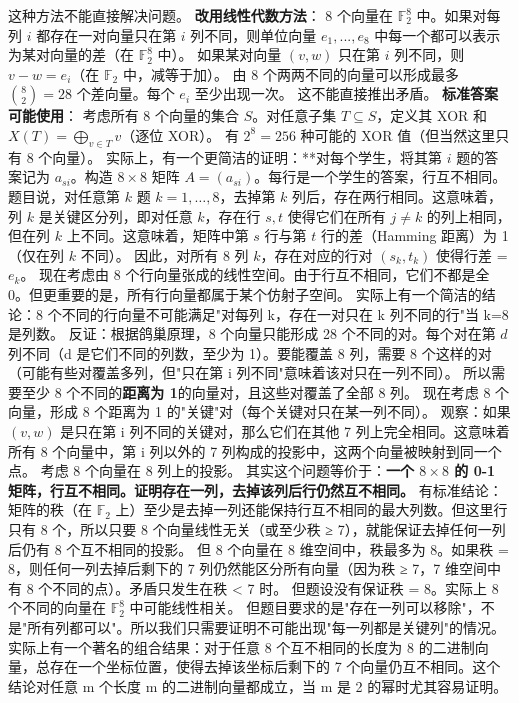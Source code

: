 \documentclass[10pt,a4paper,openany]{ctexbook}
\theoremstyle{definition}
\theoremstyle{remark}
\begin{document}
这种方法不能直接解决问题。
\textbf{改用线性代数方法}：
8 个向量在 $\mathbb{F}_2^8$ 中。如果对每列 $i$ 都存在一对向量只在第 $i$ 列不同，则单位向量 $e_1,...,e_8$ 中每一个都可以表示为某对向量的差（在 $\mathbb{F}_2^8$ 中）。
如果某对向量 $(v,w)$ 只在第 $i$ 列不同，则 $v - w = e_i$（在 $\mathbb{F}_2$ 中，减等于加）。
由 8 个两两不同的向量可以形成最多 $\binom{8}{2}=28$ 个差向量。每个 $e_i$ 至少出现一次。
这不能直接推出矛盾。
\textbf{标准答案可能使用}：
考虑所有 8 个向量的集合 $S$。对任意子集 $T \subseteq S$，定义其 XOR 和 $X(T) = \bigoplus_{v \in T} v$（逐位 XOR）。
有 $2^8 = 256$ 种可能的 XOR 值（但当然这里只有 8 个向量）。
实际上，有一个更简洁的证明：**对每个学生，将其第 $i$ 题的答案记为 $a_{si}$。构造 $8 \times 8$ 矩阵 $A = (a_{si})$。每行是一个学生的答案，行互不相同。题目说，对任意第 $k$ 题 $k=1,\dots,8$，去掉第 $k$ 列后，存在两行相同。这意味着，列 $k$ 是关键区分列，即对任意 $k$，存在行 $s, t$ 使得它们在所有 $j \neq k$ 的列上相同，但在列 $k$ 上不同。这意味着，矩阵中第 $s$ 行与第 $t$ 行的差（Hamming 距离）为 1（仅在列 $k$ 不同）。
因此，对所有 8 列 $k$，存在对应的行对 $(s_k, t_k)$ 使得行差 = $e_k$。
现在考虑由 8 个行向量张成的线性空间。由于行互不相同，它们不都是全 0。但更重要的是，所有行向量都属于某个仿射子空间。
实际上有一个简洁的结论：8 个不同的行向量不可能满足"对每列 k，存在一对只在 k 列不同的行"当 k=8 是列数。
反证：根据鸽巢原理，8 个向量只能形成 28 个不同的对。每个对在第 $d$ 列不同（d 是它们不同的列数，至少为 1）。要能覆盖 8 列，需要 8 个这样的对（可能有些对覆盖多列，但"只在第 i 列不同"意味着该对只在一列不同）。
所以需要至少 8 个不同的\textbf{距离为 1}的向量对，且这些对覆盖了全部 8 列。
现在考虑 8 个向量，形成 8 个距离为 1 的"关键"对（每个关键对只在某一列不同）。
观察：如果 $(v,w)$ 是只在第 i 列不同的关键对，那么它们在其他 7 列上完全相同。这意味着所有 8 个向量中，第 i 列以外的 7 列构成的投影中，这两个向量被映射到同一个点。
考虑 8 个向量在 8 列上的投影。
其实这个问题等价于：\textbf{一个 $8 \times 8$ 的 0-1 矩阵，行互不相同。证明存在一列，去掉该列后行仍然互不相同。}
有标准结论：矩阵的秩（在 $\mathbb{F}_2$ 上）至少是去掉一列还能保持行互不相同的最大列数。但这里行只有 8 个，所以只要 8 个向量线性无关（或至少秩 ≥ 7），就能保证去掉任何一列后仍有 8 个互不相同的投影。
但 8 个向量在 8 维空间中，秩最多为 8。如果秩 = 8，则任何一列去掉后剩下的 7 列仍然能区分所有向量（因为秩 ≥ 7，7 维空间中有 8 个不同的点）。矛盾只发生在秩 < 7 时。
但题设没有保证秩 = 8。实际上 8 个不同的向量在 $\mathbb{F}_2^8$ 中可能线性相关。
但题目要求的是"存在一列可以移除"，不是"所有列都可以"。所以我们只需要证明不可能出现"每一列都是关键列"的情况。
实际上有一个著名的组合结果：对于任意 8 个互不相同的长度为 8 的二进制向量，总存在一个坐标位置，使得去掉该坐标后剩下的 7 个向量仍互不相同。这个结论对任意 m 个长度 m 的二进制向量都成立，当 m 是 2 的幂时尤其容易证明。
\end{document}
